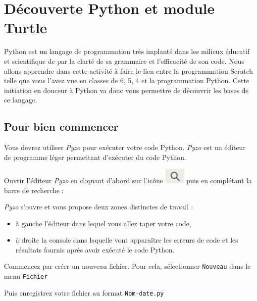\chapter{Découverte Python et module Turtle}

Python est un langage de programmation très implanté dans les milieux éducatif et scientifique de par la clarté de sa grammaire et l'efficacité de son code. Nous allons apprendre dans cette activité à faire le lien entre la programmation Scratch telle que vous l'avez vue en classes de 6, 5, 4 et la programmation Python. Cette initiation en douceur à Python va donc vous permettre de découvrir les bases de ce langage. 

\section{Pour bien commencer}

Vous devrez utiliser \emph{Pyzo} pour exécuter votre code Python. \emph{Pyzo} est un éditeur de programme léger permettant d'exécuter du code Python. 

Ouvrir l'éditeur \emph{Pyzo} en cliquant d'abord sur l'icône \includegraphics[width=1cm]{./images/activite7/icone_recherche} puis en complétant la barre de recherche : 


\emph{Pyzo} s'ouvre et vous propose deux zones distinctes de travail :
\begin{itemize}
\item à gauche l'éditeur dans lequel vous allez taper votre code,
\item à droite la console dans laquelle vont apparaître les erreurs de code et les résultats fournis après avoir exécuté le code Python.
\end{itemize}


Commencez par créer un nouveau fichier. Pour cela, sélectionner \texttt{Nouveau} dans le menu \texttt{Fichier}


Puis enregistrez votre fichier au format \texttt{Nom-date.py}

